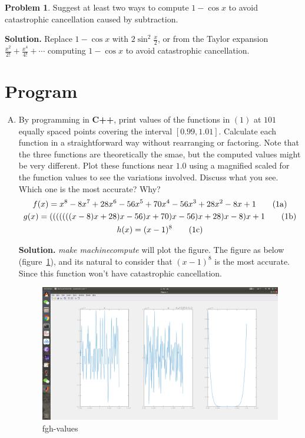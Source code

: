 \documentclass[a4paper]{book}
\newenvironment{solution}%
{\noindent\textbf{Solution.}}%
{\qedhere}
\numberwithin{equation}{chapter}
\theoremstyle{definition}
\newtheorem{pro}[exm]{Problem}
\begin{document}
\begin{pro}
  Suggest at least two ways to compute $1 - \cos x$ to avoid catastrophic cancellation caused by subtraction.
\end{pro}

\begin{solution}
  Replace $1 - \cos x$ with $2 \sin^2 \frac{x}{2}$, or from the Taylor expansion $ \frac{x^2}{2!} + \frac{x^4}{4!} + \cdots$ computing $1 - \cos x$ to avoid catastrophic cancellation.
\end{solution}


\section{Program}\label{sec:program}

\begin{enumerate}[(A)]
\item By programming in \textbf{C++}, print values of the functions in $(1)$ at $101$ equally spaced points covering the interval $[0.99,1.01]$. Calculate each function in a straightforward way without rearranging or factoring. Note that the three functions are theoretically the smae, but the computed values might be very different. Plot these functions near $1.0$ using a magnified scaled for the function values to see the variations involved. Discuss what you see. Which one is the most accurate? Why?
  \begin{gather}
    f(x) = x^8 - 8 x^7 + 28 x^6 - 56 x^5 + 70 x^4 - 56 x^3 + 28 x^2 - 8 x + 1 \tag{\textmd{1a}} \\
    g(x) = (((((((x - 8)x + 28)x - 56)x + 70)x - 56)x + 28)x -8)x +1  \tag{\textmd{1b}} \\
    h(x) = (x -1)^8   \tag{\textmd{1c}} 
  \end{gather}

  \begin{solution}
    \textit{make machinecompute} will plot the figure. The figure as below (figure~\ref{fig:1}), and its natural to consider that $(x-1)^8$ is the most accurate. Since this function won't have catastrophic cancellation.
    \begin{figure}
      \centering
      \includegraphics[scale = 0.2]{code/output/fgh}
      \caption{fgh-values}\label{fig:1}
    \end{figure}
  \end{solution}


\end{enumerate}
\end{document}
